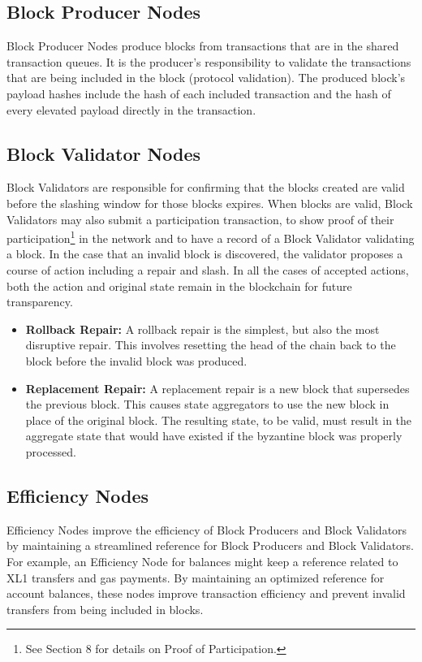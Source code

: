\documentclass{article}
\begin{document}
\subsection{Block Producer Nodes}
Block Producer Nodes produce blocks from transactions that are in the shared transaction queues. It is the producer's responsibility to validate the transactions that are being included in the block (protocol validation). The produced block's payload hashes include the hash of each included transaction and the hash of every elevated payload directly in the transaction. 

\subsection{Block Validator Nodes}
Block Validators are responsible for confirming that the blocks created are valid before the slashing window for those blocks expires. When blocks are valid, Block Validators may also submit a participation transaction, to show proof of their participation\footnote{See Section 8 for details on Proof of Participation.} in the network and to have a record of a Block Validator validating a block. In the case that an invalid block is discovered, the validator proposes a course of action including a repair and slash. In all the cases of accepted actions, both the action and original state remain in the blockchain for future transparency. 

\begin{itemize}
    \item \textbf{Rollback Repair:} A rollback repair is the simplest, but also the most disruptive repair. This involves resetting the head of the chain back to the block before the invalid block was produced.
    \item \textbf{Replacement Repair:} A replacement repair is a new block that supersedes the previous block. This causes state aggregators to use the new block in place of the original block. The resulting state, to be valid, must result in the aggregate state that would have existed if the byzantine block was properly processed.
\end{itemize}

\subsection{Efficiency Nodes}
Efficiency Nodes improve the efficiency of Block Producers and Block Validators by maintaining a streamlined reference for Block Producers and Block Validators. For example, an Efficiency Node for balances might keep a reference related to XL1 transfers and gas payments. By maintaining an optimized reference for account balances, these nodes improve transaction efficiency and prevent invalid transfers from being included in blocks.
\end{document}
